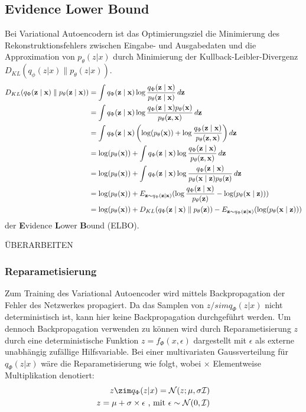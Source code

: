 \subsection{Evidence Lower Bound}
\label{elbo}
Bei Variational Autoencodern ist das Optimierungsziel die Minimierung des Rekonstruktionsfehlers zwischen Eingabe- und Ausgabedaten und die Approximation von $p_\theta (z|x)$ durch Minimierung der Kullback-Leibler-Divergenz $D_{KL}(q_\phi (z|x) \parallel p_\theta (z|x) )$.
\begin{align*}
    \small
    D_{KL}(q_\Phi(\mathbf{z\mid x})\parallel p_\theta(\mathbf{z\mid x})) &= \int q_\Phi(\mathbf{z\mid x}) \log \frac{q_\Phi(\mathbf{z\mid x})}{p_\theta(\mathbf{z\mid x})} \, d\mathbf{z}\\
    &= \int q_\Phi(\mathbf{z\mid x}) \log \frac{q_\Phi(\mathbf{z\mid x})p_\theta(\mathbf{x})}{p_\theta(\mathbf{z,x})} \,d\mathbf{z}\\
    &= \int q_\Phi(\mathbf{z\mid x}) \left( \log (p_\theta(\mathbf{x})) + \log \frac{q_\Phi(\mathbf{z\mid x})}{p_\theta(\mathbf{z,x})}\right) d\mathbf{z}\\
    &= \log (p_\theta(\mathbf{x})) + \int q_\Phi(\mathbf{z\mid x}) \log \frac{q_\Phi(\mathbf{z\mid x})}{p_\theta(\mathbf{z,x})} \,d\mathbf{z}\\
    &= \log (p_\theta(\mathbf{x})) + \int q_\Phi(\mathbf{z\mid x}) \log \frac{q_\Phi(\mathbf{z\mid x})}{p_\theta(\mathbf{x\mid z})p_\theta(\mathbf{z})} \,d\mathbf{z}\\
    &= \log (p_\theta(\mathbf{x})) + E_{\mathbf{z} \sim q_\Phi(\mathbf{z\mid x})}(\log \frac{q_\Phi(\mathbf{z\mid x})}{p_\theta(\mathbf{z})} - \log(p_\theta(\mathbf{x\mid z})))\\
    &= \log (p_\theta(\mathbf{x})) + D_{KL}(q_\Phi(\mathbf{z\mid x}) \parallel p_\theta(\mathbf{z})) - E_{\mathbf{z} \sim q_\Phi(\mathbf{z\mid x})}(\log(p_\theta(\mathbf{x\mid z})))
    \end{align*}
der \textbf{E}vidence \textbf{L}ower \textbf{B}ound (ELBO).


ÜBERARBEITEN
\subsubsection{Reparametisierung} %
Zum Training des Variational Autoencoder wird mittels Backpropagation der Fehler des Netzwerkes propagiert. Da das Samplen von $z /sim q_\Phi(z|x)$ nicht deterministisch ist, kann hier keine Backpropagation durchgeführt werden.
Um dennoch Backpropagation verwenden zu können wird durch Reparametisierung $z$ durch eine deterministische Funktion $z=f_\Phi(x,\epsilon)$ dargestellt mit $\epsilon$ als externe unabhängig zufällige Hilfsvariable. 
Bei einer multivariaten Gaussverteilung für $q_\Phi (z|x)$ wäre die Reparametisierung wie folgt, wobei $\times$ Elementweise Multiplikation denotiert:
\begin{align}{}
    z \zim q_\Phi(z|x) = \mathcal{N}(z;\mu,\sigma \mathcal{I}) \\
    z = \mu + \sigma \times \epsilon \text{ , mit } \epsilon \sim \mathcal{N}(0,\mathcal{I}) 
\end{align}

